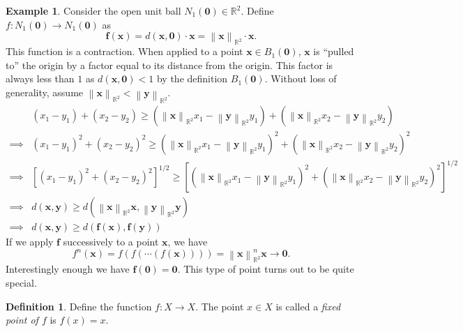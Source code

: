 \documentclass{article}
\newcommand{\R}{\mathbb{R}}
\newcommand{\x}{\mathbf{x}}
\newcommand{\f}{\mathbf{f}}
\newcommand{\y}{\mathbf{y}}
\newcommand{\ze}{\mathbf{0}}
\newcommand{\norm}[1]{\left\lVert#1\right\rVert}
\theoremstyle{definition}
\newtheorem{definition}{Definition}[section]
\newtheorem{example}{Example}[section]
\begin{document}
\begin{example}
	Consider the open unit ball $N_1(\ze)\in \R^2 $. Define $ f: N_1(\ze)\to N_1(\ze) $ as $$\f(\x) = 
		d(\x,\ze)\cdot\x = \norm{\x}_{\R^2}\cdot \x .$$
		This function is a contraction. When applied to a point $ \x\in B_1(\ze)  $, $ \x $ is ``pulled to'' the origin by a factor equal to its distance from the origin. This factor is always less than $ 1 $ as $ d(\x,\ze) < 1$ by the definition $ B_1(\ze) $. Without loss of generality, assume $ \norm{\x}_{\R^2}  < \norm{\y}_{\R^2} $.
		\begin{align*}
			&(x_1-y_1) + (x_2-y_2)  \ge (\norm{\x}_{\R^2} x_1-\norm{\y}_{\R^2}y_1) + (\norm{\x}_{\R^2}x_2-\norm{\y}_{\R^2}y_2)\\ 
		\implies &	(x_1-y_1)^2 + (x_2-y_2)^2  \ge (\norm{\x}_{\R^2} x_1-\norm{\y}_{\R^2}y_1)^2 + (\norm{\x}_{\R^2}x_2-\norm{\y}_{\R^2}y_2)^2 \\
		\implies & \left[(x_1-y_1)^2 + (x_2-y_2)^2 \right]^{1/2} \ge \left[(\norm{\x}_{\R^2} x_1-\norm{\y}_{\R^2}y_1)^2 + (\norm{\x}_{\R^2}x_2-\norm{\y}_{\R^2}y_2)^2 \right]^{1/2}\\
		\implies & d(\x,\y) \ge d\left(\norm{\x}_{\R^2}\x, \norm{\y}_{\R^2}\y\right)\\
		\implies & d(\x,\y) \ge d\left(\f(\x), \f(\y)\right)
		\end{align*}
		If we apply $ \f $ successively to a point $ \x $, we have $$ f^n(\x) = f(f(\cdots(f(\x)))) = \norm{\x}_{\R^2}^n\x \to \ze.$$ 
		Interestingly enough we have $ \f(\ze) = \ze $. This type of point turns out to be quite special.
\end{example}
\begin{definition}
	Define the function $ f:X\to X $. The point $ x\in X $ is called a \textit{\color{red}fixed point of $ f $} is $ f(x)=x $. 
\end{definition}
\end{document}
